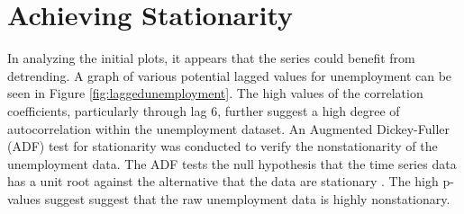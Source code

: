 \documentclass[twoside,twocolumn]{article}
\begin{document}
\section{Achieving Stationarity}

In analyzing the initial plots, it appears that the series could benefit from detrending. A graph of various potential lagged values for unemployment can be seen in Figure \ref{fig:laggedunemployment}. The high values of the correlation coefficients, particularly through lag 6, further suggest a high degree of autocorrelation within the unemployment dataset.    An Augmented Dickey-Fuller (ADF) test for stationarity was conducted to verify the nonstationarity of the unemployment data.  The ADF tests the null hypothesis that the time series data has a unit root against the alternative that the data are stationary \citep{Shumway2006}. The high p-values suggest suggest that the raw unemployment data is highly nonstationary.
\end{document}
